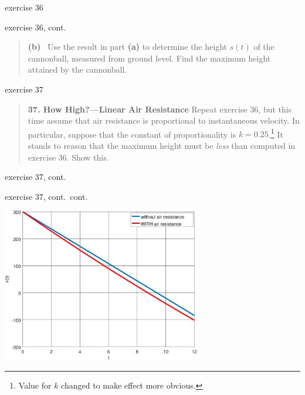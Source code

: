 \documentclass{beamer}
\begin{document}
\begin{frame}{exercise 36}
\vspace{20mm}
\end{frame}


\begin{frame}{exercise 36, cont.}

\small
\begin{quotation}
\noindent \textbf{(b)} \, Use the result in part \textbf{(a)} to determine the height $s(t)$ of the cannonball, measured from ground level.  Find the maximum height attained by the cannonball.
\end{quotation}

\vspace{60mm}
\end{frame}


\begin{frame}{exercise 37}

\begin{quotation}
\noindent \textbf{37.  How High?---Linear Air Resistance}  Repeat exercise 36, but this time assume that air resistance is proportional to instantaneous velocity.  In particular, suppose that the constant of proportionality is $k=0.25$.\footnote{Value for $k$ changed to make effect more obvious.}  It stands to reason that the maximum height must be \emph{less} than computed in exercise 36.  Show this.
\end{quotation}

\vspace{40mm}
\end{frame}


\begin{frame}{exercise 37, cont.}


\end{frame}


\begin{frame}{exercise 37, cont.~cont.}

\vspace{20mm}

\hfill \includegraphics[width=0.65\textwidth]{figs/exercise-37-3-1}
\end{frame}
\end{document}
